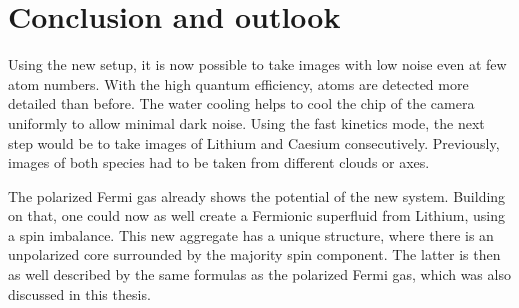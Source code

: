 \chapter{Conclusion and outlook}

Using the new setup, it is now possible to take images with low noise even at few atom numbers. With the high quantum efficiency, atoms are detected more detailed than before. The water cooling helps to cool the chip of the camera uniformly to allow minimal dark noise. Using the fast kinetics mode, the next step would be to take images of Lithium and Caesium consecutively. Previously, images of both species had to be taken from different clouds or axes.

The polarized Fermi gas already shows the potential of the new system. Building on that, one could now as well create a Fermionic superfluid from Lithium, using a spin imbalance. This new aggregate has a unique structure, where there is an unpolarized core surrounded by the majority spin component. The latter is then as well described by the same formulas as the polarized Fermi gas, which was also discussed in this thesis.